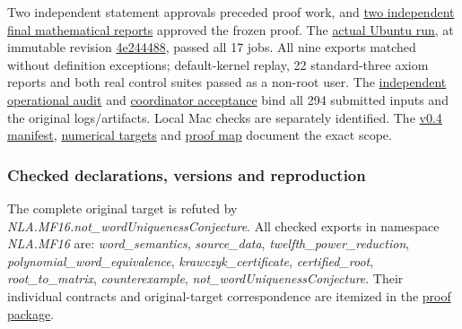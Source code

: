 \documentclass[11pt,a4paper]{article}
\begin{document}
Two independent statement approvals preceded proof work, and
\href{https://github.com/ajt60gaibb/OpenProblemsInNLA/blob/main/matrix-functions-and-stability/MF-16/lean/README.md\#review-and-checks-actually-performed}{two
independent final mathematical reports} approved the frozen proof. The
\href{https://github.com/sgstepaniants/OpenProblemsInNLA/actions/runs/34735259429}{actual
Ubuntu run}, at immutable revision
\href{https://github.com/sgstepaniants/OpenProblemsInNLA/tree/4e24448897a088ca9e7458379add1014c5d11e0c/matrix-functions-and-stability/MF-16/lean}{4e244488},
passed all 17 jobs. All nine exports matched without definition
exceptions; default-kernel replay, 22 standard-three axiom reports and
both real control suites passed as a non-root user. The
\href{https://github.com/ajt60gaibb/OpenProblemsInNLA/blob/main/matrix-functions-and-stability/MF-16/lean/verification/linux-2026-09-12/OPERATIONAL-REVIEW.md}{independent
operational audit} and
\href{https://github.com/ajt60gaibb/OpenProblemsInNLA/blob/main/matrix-functions-and-stability/MF-16/lean/verification/root-operational-2026-09-12/ROOT-CHECKS.json}{coordinator
acceptance} bind all 294 submitted inputs and the original
logs/artifacts. Local Mac checks are separately identified. The
\href{https://github.com/ajt60gaibb/OpenProblemsInNLA/blob/main/matrix-functions-and-stability/MF-16/lean/formalization.yaml}{v0.4
manifest},
\href{https://github.com/ajt60gaibb/OpenProblemsInNLA/blob/main/matrix-functions-and-stability/MF-16/lean/NUMERICAL_TARGETS.md}{numerical
targets} and
\href{https://github.com/ajt60gaibb/OpenProblemsInNLA/blob/main/matrix-functions-and-stability/MF-16/lean/verification/PROOF_MAP.md}{proof
map} document the exact scope.

\subsubsection{Checked declarations, versions and
reproduction}\label{checked-declarations-versions-and-reproduction}

The complete original target is refuted by
\textit{NLA.MF16.not\_wordUniquenessConjecture}. All checked exports in
namespace \textit{NLA.MF16} are: \textit{word\_semantics},
\textit{source\_data}, \textit{twelfth\_power\_reduction},
\textit{polynomial\_word\_equivalence}, \textit{krawczyk\_certificate},
\textit{certified\_root}, \textit{root\_to\_matrix},
\textit{counterexample}, \textit{not\_wordUniquenessConjecture}. Their
individual contracts and original-target correspondence are itemized in
the
\href{https://github.com/ajt60gaibb/OpenProblemsInNLA/blob/main/matrix-functions-and-stability/MF-16/lean/README.md\#complete-target-and-actual-counterexample}{proof
package}.
\end{document}
